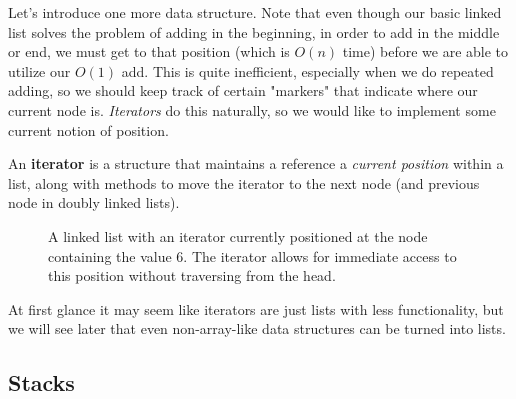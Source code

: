   Let's introduce one more data structure. Note that even though our basic linked list solves the problem of adding in the beginning, in order to add in the middle or end, we must get to that position (which is $O(n)$ time) before we are able to utilize our $O(1)$ add. This is quite inefficient, especially when we do repeated adding, so we should keep track of certain "markers" that indicate where our current node is. \textit{Iterators} do this naturally, so we would like to implement some current notion of position. 

  \begin{definition}[Iterator]
    An \textbf{iterator} is a structure that maintains a reference a \textit{current position} within a list, along with methods to move the iterator to the next node (and previous node in doubly linked lists). 

    \begin{figure}[H]
      \centering 
      \caption{A linked list with an iterator currently positioned at the node containing the value 6. The iterator allows for immediate access to this position without traversing from the head.}
      \label{fig:linked_list_iterator}
    \end{figure}
  \end{definition}

  At first glance it may seem like iterators are just lists with less functionality, but we will see later that even non-array-like data structures can be turned into lists.  

\subsection{Stacks} 

